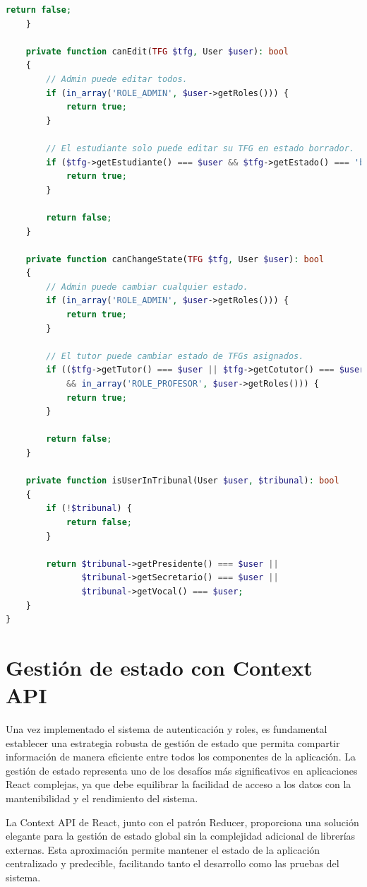 \documentclass[12pt,a4paper,oneside]{report}
\begin{document}
\begin{lstlisting}[language=PHP]
        return false;
    }

    private function canEdit(TFG $tfg, User $user): bool
    {
        // Admin puede editar todos.
        if (in_array('ROLE_ADMIN', $user->getRoles())) {
            return true;
        }

        // El estudiante solo puede editar su TFG en estado borrador.
        if ($tfg->getEstudiante() === $user && $tfg->getEstado() === 'borrador') {
            return true;
        }

        return false;
    }

    private function canChangeState(TFG $tfg, User $user): bool
    {
        // Admin puede cambiar cualquier estado.
        if (in_array('ROLE_ADMIN', $user->getRoles())) {
            return true;
        }

        // El tutor puede cambiar estado de TFGs asignados.
        if (($tfg->getTutor() === $user || $tfg->getCotutor() === $user) 
            && in_array('ROLE_PROFESOR', $user->getRoles())) {
            return true;
        }

        return false;
    }

    private function isUserInTribunal(User $user, $tribunal): bool
    {
        if (!$tribunal) {
            return false;
        }

        return $tribunal->getPresidente() === $user ||
               $tribunal->getSecretario() === $user ||
               $tribunal->getVocal() === $user;
    }
}
\end{lstlisting}

\section{Gestión de estado con Context
API}\label{gestiuxf3n-de-estado-con-context-api}

Una vez implementado el sistema de autenticación y roles, es fundamental
establecer una estrategia robusta de gestión de estado que permita
compartir información de manera eficiente entre todos los componentes de
la aplicación. La gestión de estado representa uno de los desafíos más
significativos en aplicaciones React complejas, ya que debe equilibrar
la facilidad de acceso a los datos con la mantenibilidad y el
rendimiento del sistema.

La Context API de React, junto con el patrón Reducer, proporciona una
solución elegante para la gestión de estado global sin la complejidad
adicional de librerías externas. Esta aproximación permite mantener el
estado de la aplicación centralizado y predecible, facilitando tanto el
desarrollo como las pruebas del sistema.
\end{document}
